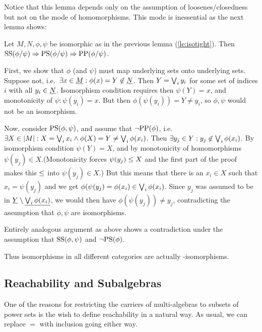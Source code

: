 Notice that this lemma depends only on the assumption of
loosenes/closedness but not on the mode of homomorphisms.
This mode is inessential as the next lemma shows:

\begin{Lemma}
Let $M,N,\phi,\psi$ be isomorphic as in the previous lemma
(\ref{le:isotight}). Then
${\rm SS}(\phi/\psi)\Rightarrow{\rm PS}(\phi/\psi)\Rightarrow{\rm PP}(\phi/\psi)$.
\end{Lemma}
\begin{Proof}
First, we show that $\phi$ (and $\psi$) must map underlying sets onto
underlying sets.  Suppose not, i.e.\ $\exists x\in\underline {M} :
\phi(x)=Y\not\in\underline {N}$. Then $Y=\bigvee_i y_i$ for some set of
indices $i$ with all $y_i\in\underline {N}$. Isomorphism condition requires
then $\psi(Y)=x$, and monotonicity of $\psi: \psi(y_i)=x$. But then
$\phi(\psi(y_i))=Y\not=y_i$, so $\phi, \psi$ would not be an isomorphism.

Now, consider ${\rm PS}(\phi,\psi)$, and assume that
$\neg{\rm PP}(\phi)$, i.e.\ $\exists X\in|M| : X=\bigvee_i x_i \land
\phi(X)=Y\not=\bigvee_i \phi(x_i)$. Then $\exists y_j\in Y:y_j\not\in\bigvee_i \phi(x_i)$.
By isomorphism condition $\psi(Y)=X$, and by monotonicity of
homomorphisms $\psi(y_j)\in X$.(Monotonicity forces $\psi(y_j)\leq X$
and the first part of the proof makes this $\leq$ into $\psi(y_j)\in
X$.) But this means that there is an $x_i\in X$ such that
$x_i=\psi(y_j)$ and we get $\phi(\psi(y_j) = \phi(x_i) \in\bigvee_i
\phi(x_i)$. Since $y_j$ was assumed to be in
$\underline {Y}\setminus\underline {\bigvee_i\phi(x_i)}$, we would then have
$\phi(\psi(y_j))\not= y_j$, contradicting the assumption that $\phi,
\psi$ are isomorphisms.

Entirely
analogous argument as above shows a contradiction under the assumption that
 ${\rm SS}(\phi,\psi)$ and  $\neg{\rm PS}(\phi)$. 
\end{Proof}

Thus isomorphisms in all different categories are actually \PP-isomorphisms.

\subsection{Reachability and Subalgebras}
One of the reasons for restricting the carriers of multi-algebras to
subsets of power sets is the wish to define reachability in a natural
way. As usual, we can replace $=$ with inclusion going either
way.

